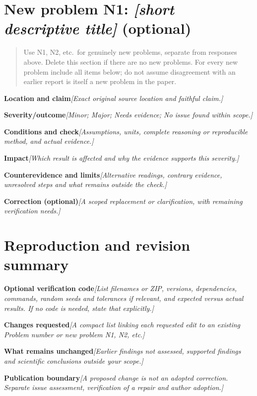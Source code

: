 \documentclass[11pt]{article}
\newcommand{\prompt}[1]{\textit{\textcolor{promptink}{[#1]}}}
\newcommand{\entry}[2]{\textbf{#1}\quad\prompt{#2}\par}
\newcommand{\guidance}[1]{\begin{quote}\small #1\end{quote}}
\begin{document}
\section{New problem N1: \prompt{short descriptive title} (optional)}
\guidance{Use N1, N2, etc.\ for genuinely new problems, separate from responses above.
Delete this section if there are no new problems. For every new problem include
all items below; do not assume disagreement with an earlier report is itself a new
problem in the paper.}
\entry{Location and claim}{Exact original source location and faithful claim.}
\entry{Severity/outcome}{Minor; Major; Needs evidence; No issue found within scope.}
\entry{Conditions and check}{Assumptions, units, complete reasoning or reproducible
method, and actual evidence.}
\entry{Impact}{Which result is affected and why the evidence supports this severity.}
\entry{Counterevidence and limits}{Alternative readings, contrary evidence,
unresolved steps and what remains outside the check.}
\entry{Correction (optional)}{A scoped replacement or clarification, with remaining
verification needs.}

\section{Reproduction and revision summary}
\entry{Optional verification code}{List filenames or ZIP, versions, dependencies,
commands, random seeds and tolerances if relevant, and expected versus actual results.
If no code is needed, state that explicitly.}
\entry{Changes requested}{A compact list linking each requested edit to an existing
Problem number or new problem N1, N2, etc.}
\entry{What remains unchanged}{Earlier findings not assessed, supported findings
and scientific conclusions outside your scope.}
\entry{Publication boundary}{A proposed change is not an adopted correction.
Separate issue assessment, verification of a repair and author adoption.}
\end{document}
